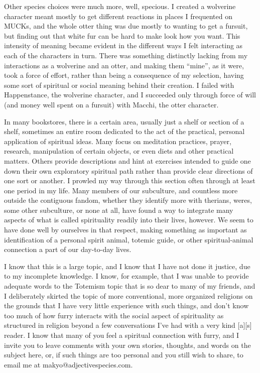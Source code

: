 Other species choices were much more, well, specious.  I created a wolverine character meant mostly to get different reactions in places I frequented on MUCKs, and the whole otter thing was due mostly to wanting to get a fursuit, but finding out that white fur can be hard to make look how you want. This intensity of meaning became evident in the different ways I felt interacting as each of the characters in turn.  There was something distinctly lacking from my interactions as a wolverine and an otter, and making them ``mine'', as it were, took a force of effort, rather than being a consequence of my selection, having some sort of spiritual or social meaning behind their creation.  I failed with Happenstance, the wolverine character, and I succeeded only through force of will (and money well spent on a fursuit) with Macchi, the otter character.

In many bookstores, there is a certain area, usually just a shelf or section of a shelf, sometimes an entire room dedicated to the act of the practical, personal application of spiritual ideas.  Many focus on meditation practices, prayer, research, manipulation of certain objects, or even diets and other practical matters.  Others provide descriptions and hint at exercises intended to guide one down their own exploratory spiritual path rather than provide clear directions of one sort or another.  I prowled my way through this section often through at least one period in my life.  Many members of our subculture, and countless more outside the contiguous fandom, whether they identify more with therians, weres, some other subculture, or none at all, have found a way to integrate many aspects of what is called spirituality readily into their lives, however.  We seem to have done well by ourselves in that respect, making something as important as identification of a personal spirit animal, totemic guide, or other spiritual-animal connection a part of our day-to-day lives.

I know that this is a large topic, and I know that I have not done it justice, due to my incomplete knowledge.  I know, for example, that I was unable to provide adequate words to the Totemism topic that is so dear to many of my friends, and I deliberately skirted the topic of more conventional, more organized religions on the grounds that I have very little experience with such things, and don't know too much of how furry interacts with the social aspect of spirituality as structured in religion beyond a few conversations I've had with a very kind [a][s] reader.  I know that many of you feel a spiritual connection with furry, and I invite you to leave comments with your own stories, thoughts, and words on the subject here, or, if such things are too personal and you still wish to share, to email me at makyo@adjectivespecies.com.

